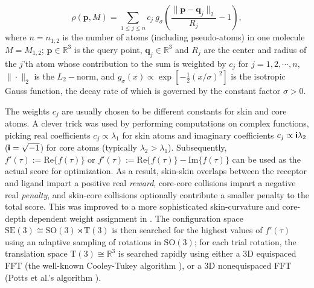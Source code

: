 \documentclass[article]{gmp2014}
\theoremstyle{definition}
\newcommand{\ii}{\text{\textsf{\textbf{i}}}}
\begin{document}
%
\begin{equation}
    \rho(\mathbf{p}, M) = \sum_{1 \leq j \leq n} c_j ~ g_\sigma \left( \frac{\| \mathbf{p} - \mathbf{q}_j \|_2}{R_j} - 1 \right), \label{eq_method_2}
\end{equation}
%
where $n = n_{1,2}$ is the number of atoms (including pseudo-atoms) in one molecule $M = M_{1,2}$; $\mathbf{p} \in \mathds{R}^3$ is the query point, $\mathbf{q}_j \in \mathds{R}^3$ and $R_j$ are the center and radius of the $j$'th atom whose contribution to the sum is weighted by $c_j$ for $j = 1, 2, \cdots, n$, $\|\cdot\|_2$ is the $L_2-$norm, and $g_\sigma(x) \propto \exp[-\frac{1}{2}(x/\sigma)^2]$ is the isotropic Gauss function, the decay rate of which is governed by the constant factor $\sigma > 0$.

The weights $c_j$ are usually chosen to be different constants for skin and core atoms. A clever trick was used by performing computations on complex functions, picking real coefficients $c_j \propto \lambda_1$ for skin atoms and imaginary coefficients $c_j \propto \ii \lambda_2$ ($\ii = \sqrt{-1}$) for core atoms (typically $\lambda_2 > \lambda_1$).
%
Subsequently, $f'(\tau) := \mathrm{Re}\{ f(\tau)\}$ or $f'(\tau) := \mathrm{Re}\{ f(\tau)\} - \mathrm{Im}\{ f(\tau)\}$ can be used as the actual score for optimization. As a result, skin-skin overlaps between the receptor and ligand impart a positive real {\it reward}, core-core collisions impart a negative real {\it penalty}, and skin-core collisions optionally contribute a smaller penalty to the total score. This was improved to a more sophisticated skin-curvature and core-depth dependent weight assignment in \cite{Bajaj2013}.
%
The configuration space $\mathrm{SE}(3) \cong \mathrm{SO}(3) \rtimes \mathrm{T}(3)$ is then searched for the highest values of $f'(\tau)$ using an adaptive sampling of rotations in $\mathrm{SO}(3)$; for each trial rotation, the translation space $\mathrm{T}(3) \cong \mathds{R}^3$ is searched rapidly using either a 3D equispaced FFT (the well-known Cooley-Tukey algorithm \cite{Cooley1965}), or a 3D nonequispaced FFT (Potts et al.'s algorithm \cite{Potts2001}).
\end{document}
